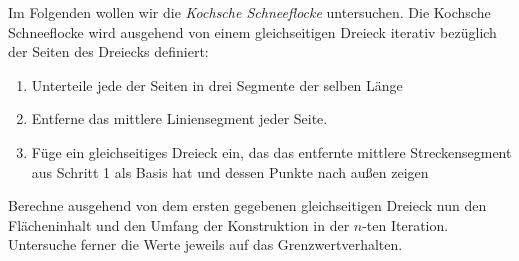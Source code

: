 \begin{prob}[Fraktale]
  Im Folgenden wollen wir die \emph{Kochsche Schneeflocke} untersuchen.
  Die Kochsche Schneeflocke wird ausgehend von einem gleichseitigen Dreieck
  iterativ bezüglich der Seiten des Dreiecks definiert:
  \begin{enumerate}[label=(\arabic*)]
  \item Unterteile jede der Seiten in drei Segmente der selben Länge
  \item Entferne das mittlere Liniensegment jeder Seite.
  \item Füge ein gleichseitiges Dreieck ein, das das entfernte mittlere Streckensegment aus
    Schritt 1 als Basis hat und dessen Punkte nach außen zeigen
  \end{enumerate}
  Berechne ausgehend von dem ersten gegebenen gleichseitigen Dreieck nun den
  Flächeninhalt und den Umfang der Konstruktion in der $n$-ten Iteration.
  Untersuche ferner die Werte jeweils auf das Grenzwertverhalten.
  \begin{center}
    
  \end{center}
\end{prob}
